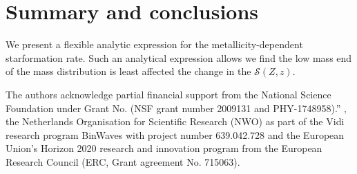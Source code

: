 \documentclass[twocolumn]{aastex631}
\newcommand{\SFRDzZ}{\ensuremath{\mathcal{S}(Z,z)}\xspace}
\begin{document}
\section{Summary and conclusions}

We present a flexible analytic expression for the metallicity-dependent starformation rate.
Such an analytical expression allows 
we find the low mass end of the mass distribution is least affected the change in the \SFRDzZ. 


\begin{acknowledgments}
The authors acknowledge partial financial support from the  National Science Foundation under Grant No. (NSF grant number 2009131  and PHY-1748958).”
, the Netherlands Organisation for Scientific Research (NWO) as part of the Vidi research program BinWaves with project number 639.042.728 and the European Union’s Horizon 2020 research and innovation program from the European Research Council (ERC, Grant agreement No. 715063). 
\end{acknowledgments}



\end{document}
